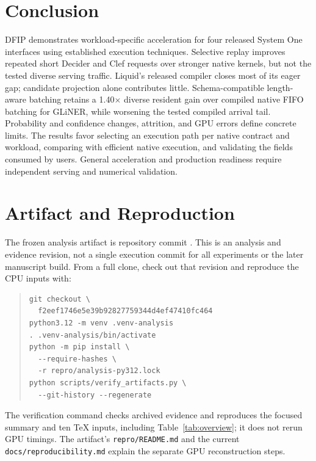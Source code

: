 \documentclass[10pt,twocolumn]{article}
\begin{document}
\section{Conclusion}
DFIP demonstrates workload-specific acceleration for four released System One interfaces using established execution techniques. Selective replay improves repeated short Decider and Clef requests over stronger native kernels, but not the tested diverse serving traffic. Liquid's released compiler closes most of its eager gap; candidate projection alone contributes little. Schema-compatible length-aware batching retains a 1.40$\times$ diverse resident gain over compiled native FIFO batching for GLiNER, while worsening the tested compiled arrival tail. Probability and confidence changes, attrition, and GPU errors define concrete limits. The results favor selecting an execution path per native contract and workload, comparing with efficient native execution, and validating the fields consumed by users. General acceleration and production readiness require independent serving and numerical validation.




\appendix
\section{Artifact and Reproduction}
\label{app:artifact}
The frozen analysis artifact is repository commit \href{https://github.com/superagent-ai/dfip/tree/f2eef1746e5e39b92827759344d4ef47410fc464}{\texttt{}}. This is an analysis and evidence revision, not a single execution commit for all experiments or the later manuscript build. From a full clone, check out that revision and reproduce the CPU inputs with:
\begin{quote}\small
\begin{verbatim}
git checkout \
  f2eef1746e5e39b92827759344d4ef47410fc464
python3.12 -m venv .venv-analysis
. .venv-analysis/bin/activate
python -m pip install \
  --require-hashes \
  -r repro/analysis-py312.lock
python scripts/verify_artifacts.py \
  --git-history --regenerate
\end{verbatim}
\end{quote}
The verification command checks archived evidence and reproduces the focused summary and ten TeX inputs, including Table~\ref{tab:overview}; it does not rerun GPU timings. The artifact's \texttt{repro/README.md} and the current \texttt{docs/reproducibility.md} explain the separate GPU reconstruction steps.
\end{document}
